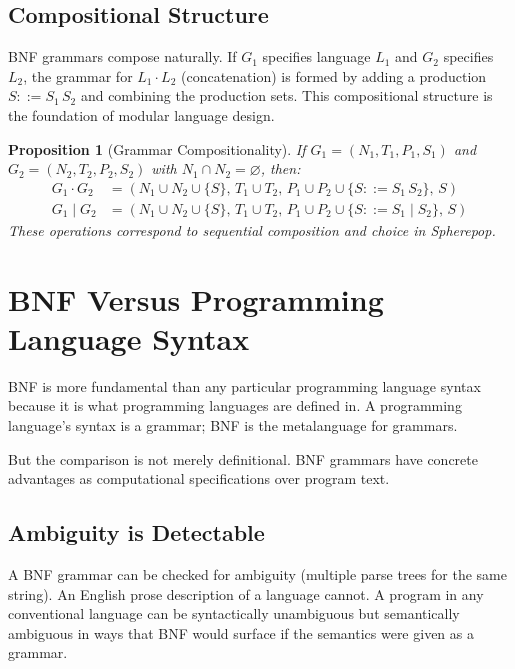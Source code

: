 \documentclass[12pt, a4paper, openany]{book}
\theoremstyle{plain}
\newtheorem{proposition}[theorem]{Proposition}
\theoremstyle{definition}
\theoremstyle{remark}
\begin{document}
\subsection{Compositional Structure}

BNF grammars compose naturally. If $G_1$ specifies language $L_1$ and $G_2$
specifies $L_2$, the grammar for $L_1 \cdot L_2$ (concatenation) is formed by
adding a production $S ::= S_1\, S_2$ and combining the production sets. This
compositional structure is the foundation of modular language design.

\begin{proposition}[Grammar Compositionality]
If $G_1 = (N_1, T_1, P_1, S_1)$ and $G_2 = (N_2, T_2, P_2, S_2)$ with
$N_1 \cap N_2 = \varnothing$, then:
\begin{align*}
G_1 \cdot G_2 &= (N_1 \cup N_2 \cup \{S\},\, T_1 \cup T_2,\,
                  P_1 \cup P_2 \cup \{S ::= S_1\, S_2\},\, S) \\
G_1 \mid G_2 &= (N_1 \cup N_2 \cup \{S\},\, T_1 \cup T_2,\,
                  P_1 \cup P_2 \cup \{S ::= S_1 \mid S_2\},\, S)
\end{align*}
These operations correspond to sequential composition and choice in Spherepop.
\end{proposition}

\section{BNF Versus Programming Language Syntax}

BNF is more fundamental than any particular programming language syntax because
it is what programming languages are defined in. A programming language's syntax
is a grammar; BNF is the metalanguage for grammars.

But the comparison is not merely definitional. BNF grammars have concrete
advantages as computational specifications over program text.

\subsection{Ambiguity is Detectable}

A BNF grammar can be checked for ambiguity (multiple parse trees for the same
string). An English prose description of a language cannot. A program in any
conventional language can be syntactically unambiguous but semantically ambiguous
in ways that BNF would surface if the semantics were given as a grammar.
\end{document}
